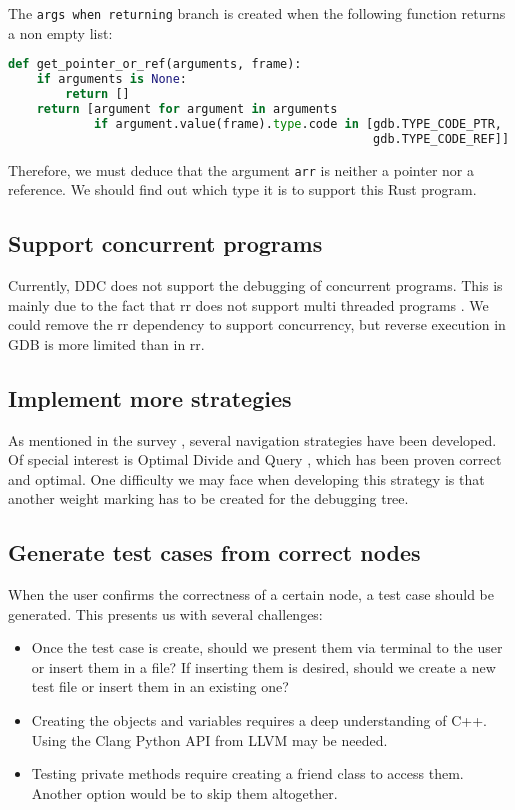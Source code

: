 The \verb|args when returning| branch is created when the following function returns a non empty list:
\begin{lstlisting}[language=Python, caption=Python function to select arguments passed as reference or pointer, frame=tb]
def get_pointer_or_ref(arguments, frame):
    if arguments is None:
        return []
    return [argument for argument in arguments
            if argument.value(frame).type.code in [gdb.TYPE_CODE_PTR,
                                                   gdb.TYPE_CODE_REF]]
\end{lstlisting}
Therefore, we must deduce that the argument \verb|arr| is neither a pointer nor a reference. We should find out which type it is to support this Rust program.
\subsection{Support concurrent programs}
Currently, DDC does not support the debugging of concurrent programs.
This is mainly due to the fact that rr does not support multi threaded programs \cite{rr}.
We could remove the rr dependency to support concurrency, but reverse execution in GDB \cite{ReverseExecution_GDB} is more limited than in rr.
\subsection{Implement more strategies}
As mentioned in the survey \cite{Survey}, several navigation strategies have been developed.
Of special interest is Optimal Divide and Query \cite{optimal_strategy}, which has been proven correct and optimal.
One difficulty we may face when developing this strategy is that another weight marking has to be created for the debugging tree.
\subsection{Generate test cases from correct nodes}
When the user confirms the correctness of a certain node, a test case should be generated.
This presents us with several challenges:
\begin{itemize}
    \item Once the test case is create, should we present them via terminal to the user or insert them in a file? If inserting them is desired, should we create a new test file or insert them in an existing one?
    \item Creating the objects and variables requires a deep understanding of C++. Using the Clang Python API from LLVM \cite{llvm} may be needed.
    \item Testing private methods require creating a friend class to access them. Another option would be to skip them altogether.
\end{itemize}


